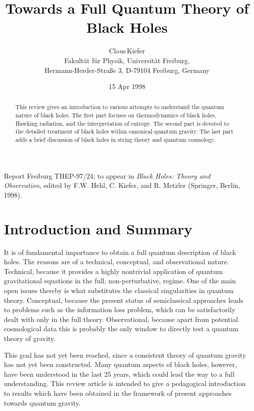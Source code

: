 \documentclass[12pt]{article}
\begin{document}
\title{Towards a Full Quantum Theory of Black Holes}

\author{Claus\,Kiefer \\
Fakult\"at f\"ur Physik, Universit\"at Freiburg,\\
Hermann-Herder-Stra\ss e 3, D-79104 Freiburg, Germany}

\date{15 Apr 1998}

\maketitle

\begin{abstract}
This review gives an introduction to various attempts to
understand the quantum nature of black holes. The first part
focuses on thermodynamics of black holes, Hawking radiation,
and the interpretation of entropy. The second part is devoted
to the detailed treatment of black holes within canonical
quantum gravity. The last part adds a brief discussion 
of black holes in string theory and quantum cosmology.
\end{abstract}

\small
\noindent Report
     Freiburg THEP-97/24; to appear in {\em Black Holes: Theory and
     Observation}, edited by F.W. Hehl, C. Kiefer, and R. Metzler
     (Springer, Berlin, 1998).
\normalsize

\section{Introduction and Summary}
It is of fundamental importance to obtain a full quantum description
of black holes. The reasons are of a technical, conceptual, and
observational nature. Technical, because it provides a highly
nontrivial application of quantum gravitational equations
in the full, non-perturbative, regime. One of the main open issues thereby
is what substitutes the classical singularities in quantum theory.
 Conceptual, because
the present status of semiclassical approaches leads to problems
such as the information loss problem, which can be 
satisfactorily dealt with only in the full theory.
Observational, because apart from potential cosmological
data this is probably the only window to directly test a quantum
theory of gravity. 

This goal has not yet been reached, since a consistent theory of
quantum gravity has not yet been constructed.
Many quantum aspects of black holes, however, have been
understood in the last 25 years, which could lead the way to a
full understanding. This review article is intended to give
a pedagogical introduction to results which have been obtained
in the framework of present approaches towards quantum gravity.
\end{document}
